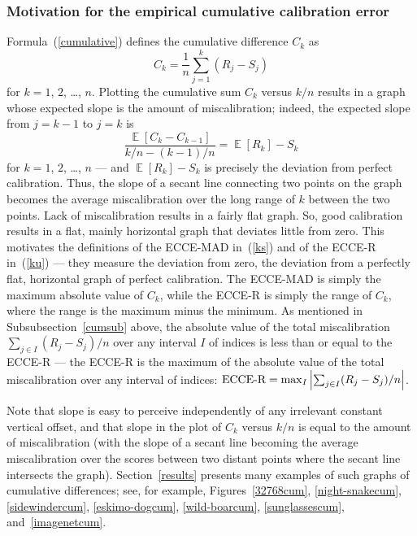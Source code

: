 \documentclass{article}
\DeclareMathOperator{\E}{\mathop{}\mathbb{E}}
\begin{document}
\subsubsection{Motivation for the empirical cumulative calibration error}
\label{cumulativeplot}

Formula~(\ref{cumulative}) defines the cumulative difference $C_k$ as
%
\begin{equation}
\label{cumulativedup}
C_k = \frac{1}{n} \sum_{j=1}^k (R_j - S_j)
\end{equation}
%
for $k = 1$, $2$, \dots, $n$.
Plotting the cumulative sum $C_k$ versus $k/n$
results in a graph whose expected slope is the amount of miscalibration;
indeed, the expected slope from $j = k - 1$ to $j = k$ is
%
\begin{equation}
\frac{\E[C_k - C_{k-1}]}{k/n - (k-1)/n} = \E[R_k] - S_k
\end{equation}
%
for $k = 1$, $2$, \dots, $n$ --- and $\E[R_k] - S_k$ is precisely
the deviation from perfect calibration.
Thus, the slope of a secant line connecting two points on the graph
becomes the average miscalibration over the long range of $k$
between the two points.
Lack of miscalibration results in a fairly flat graph.
So, good calibration results in a flat, mainly horizontal graph
that deviates little from zero.
This motivates the definitions of the ECCE-MAD in~(\ref{ks})
and of the ECCE-R in~(\ref{ku}) --- they measure the deviation from zero,
the deviation from a perfectly flat, horizontal graph of perfect calibration.
The ECCE-MAD is simply the maximum absolute value of $C_k$,
while the ECCE-R is simply the range of $C_k$, where the range
is the maximum minus the minimum.
As mentioned in Subsubsection~\ref{cumsub} above,
the absolute value of the total miscalibration
$\sum_{j \in I} (R_j - S_j)/n$
over any interval $I$ of indices is less than or equal to the ECCE-R ---
the ECCE-R is the maximum of the absolute value
of the total miscalibration over any interval of indices:
$\hbox{ECCE-R} = \max_I \left| \sum_{j \in I} (R_j - S_j)/n \right|$.

Note that slope is easy to perceive independently
of any irrelevant constant vertical offset, and that slope
in the plot of $C_k$ versus $k/n$ is equal to the amount of miscalibration
(with the slope of a secant line becoming the average miscalibration
over the scores between two distant points
where the secant line intersects the graph).
Section~\ref{results} presents many examples of such graphs
of cumulative differences; see, for example,
Figures~\ref{32768cum}, \ref{night-snakecum}, \ref{sidewindercum},
\ref{eskimo-dogcum}, \ref{wild-boarcum}, \ref{sunglassescum},
and~\ref{imagenetcum}.
\end{document}
